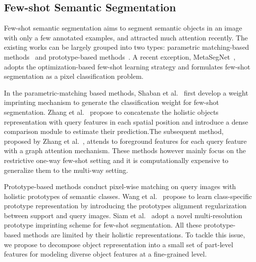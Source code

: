 \documentclass[runningheads]{llncs}
\begin{document}
\subsection{Few-shot Semantic Segmentation}
Few-shot semantic segmentation aims to segment semantic objects in an image with only a few annotated examples, and attracted much attention recently. The existing works can be largely grouped into two types: parametric matching-based methods~\cite{zhang2018sg,zhang2019canet,zhang2019pyramid,nguyen2019feature,boots2017one} and prototype-based methods~\cite{siam2019adaptive,wang2019panet}. A recent exception, MetaSegNet~\cite{tian2019differentiable}, adopts the optimization-based few-shot learning strategy and formulates few-shot segmentation as a pixel classification problem.

In the parametric-matching based methods, Shaban et al.~\cite{boots2017one} first develop a weight imprinting mechanism to generate the classification weight for few-shot segmentation.
Zhang et al.~\cite{zhang2019canet} propose to concatenate the holistic objects representation with query features in each spatial position and introduce a dense comparison module to estimate their prediction.The subsequent method, proposed by Zhang et al.~\cite{zhang2019pyramid}, attends to foreground features for each query feature with a graph attention mechanism.
These methods however mainly focus on the restrictive one-way few-shot setting and it is computationally expensive to generalize them to the multi-way setting.

Prototype-based methods conduct pixel-wise matching on query images with holistic prototypes of semantic classes. Wang et al.~\cite{wang2019panet} propose to learn class-specific prototype representation by introducing the prototypes alignment regularization between support and query images. Siam et al.~\cite{siam2019adaptive} adopt a novel multi-resolution prototype imprinting scheme for few-shot segmentation. 
All these prototype-based methods are limited by their holistic representations. To tackle this issue, we propose to decompose object representation into a small set of part-level features for modeling diverse object features at a fine-grained level.
\end{document}
